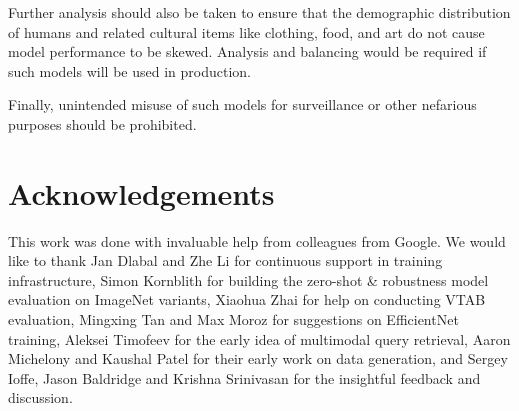 \documentclass{article}
\begin{document}
Further analysis should also be taken to ensure that the demographic distribution of humans and related cultural items like clothing, food, and art do not cause model performance to be skewed. Analysis and balancing would be required if such models will be used in production. 

Finally, unintended misuse of such models for surveillance or other nefarious purposes should be prohibited.

\section*{Acknowledgements}

This work was done with invaluable help from colleagues from Google. We would like to thank Jan Dlabal and Zhe Li for continuous support in training infrastructure, Simon Kornblith for building the zero-shot \& robustness model evaluation on ImageNet variants, Xiaohua Zhai for help on conducting VTAB evaluation, Mingxing Tan and Max Moroz for suggestions on EfficientNet training, Aleksei Timofeev for the early idea of multimodal query retrieval, Aaron Michelony and Kaushal Patel for their early work on data generation, and Sergey Ioffe, Jason Baldridge and Krishna Srinivasan for the insightful feedback and discussion.
\end{document}

